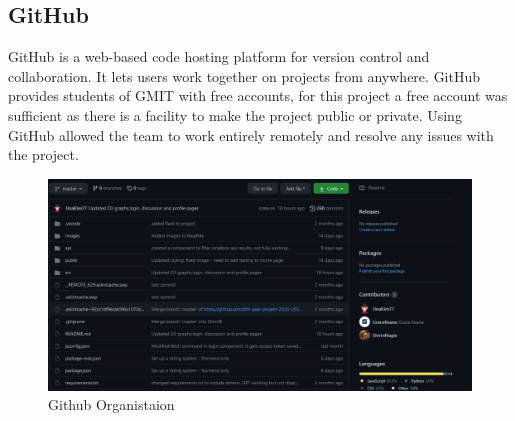 \subsection{GitHub}
GitHub is a web-based code hosting platform for version control and collaboration. It lets users work together on projects from anywhere.\cite{github}
GitHub provides students of GMIT with free accounts, for this project a free account was sufficient as there is a facility to make the project public or private. Using GitHub allowed the team to work entirely remotely and resolve any issues with the project. 
\begin{figure}[H]
    \centering
    \includegraphics[scale=0.3]{img/github.PNG}
    \caption{Github Organistaion}
    \label{fig:my_label02}
\end{figure}





